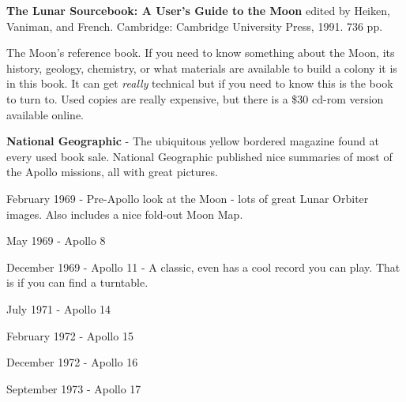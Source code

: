 \documentclass[12pt]{article}
\newenvironment{Quote}
               {\list{}{\setlength{\rightmargin}{5pt}%
                        \setlength{\leftmargin}{5pt}
                        \setlength{\baselineskip}{12pt}}%
                \item\relax}
               {\endlist}
\begin{document}

\vfill

{\bf The Lunar Sourcebook: A User's Guide to the Moon} edited by
Heiken, Vaniman, and French.  Cambridge: Cambridge University Press,
1991. 736 pp.
\begin{Quote}
  The Moon's reference book.  If you need to know something about the
  Moon, its history, geology, chemistry, or what materials are
  available to build a colony it is in this book.  It can get {\em
  really} technical but if you need to know this is the book to turn
  to.  Used copies are really expensive, but there is a \$30 cd-rom
  version available online.
\end{Quote}

\vskip 5mm

{\bf National Geographic} - The ubiquitous yellow bordered magazine
found at every used book sale.  National Geographic published nice
summaries of most of the Apollo missions, all with great pictures.

\begin{Quote}
  
  {\sc February 1969} - Pre-Apollo look at the Moon - lots of great
  Lunar Orbiter images.  Also includes a nice fold-out Moon Map.
  
  {\sc May 1969} - Apollo 8
  
  {\sc December 1969} - Apollo 11 - A classic, even has a cool record
  you can play.  That is if you can find a turntable.
  
  {\sc July 1971} - Apollo 14
  
  {\sc February 1972} - Apollo 15
  
  {\sc December 1972} - Apollo 16
  
  {\sc September 1973} - Apollo 17
\end{Quote}

\normalsize

\clearpage
\end{document}
